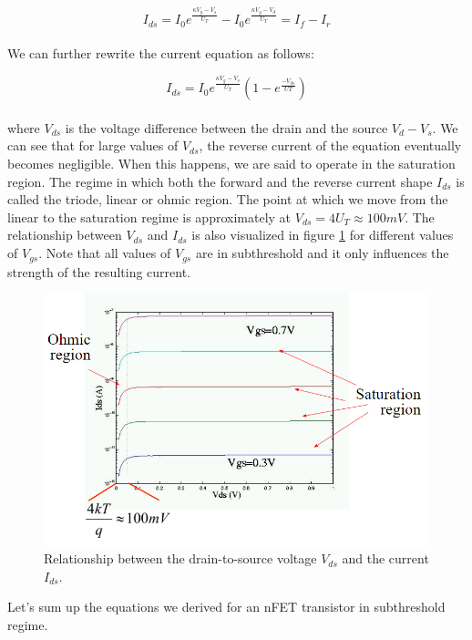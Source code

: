 \begin{equation}
    I_{ds} = I_0 e^{\frac{\kappa V_g - V_s}{U_T}} - I_0 e^{\frac{\kappa V_g - V_d}{U_T}} = I_f - I_r
\end{equation}\\

We can further rewrite the current equation as follows:

\begin{equation}
    I_{ds} = I_0 e^{\frac{\kappa V_g - V_s}{U_T}} (1 - e^{\frac{-V_{ds}}{UT}})
\end{equation}\\

where $V_{ds}$ is the voltage difference between the drain and the source $V_d - V_s$. We can see that for large values of $V_{ds}$, the reverse current of the equation eventually becomes negligible. When this happens, we are said to operate in the saturation region. The regime in which both the forward and the reverse current shape $I_{ds}$ is called the triode, linear or ohmic region. The point at which we move from the linear to the saturation regime is approximately at $V_{ds} = 4 U_T \approx 100 mV$. %
The relationship between $V_{ds}$ and $I_{ds}$ is also visualized in figure \ref{fig:vsd_vs_ids} for different values of $V_{gs}$. Note that all values of $V_{gs}$ are in subthreshold and it only influences the strength of the resulting current.\\

\begin{figure}
    \centering
    \includegraphics[width=.8\linewidth]{Figures/Vds_vs_Ids.PNG}
    \caption{Relationship between the drain-to-source voltage $V_{ds}$ and the current $I_{ds}$.}
    \label{fig:vsd_vs_ids}
\end{figure}

Let's sum up the equations we derived for an nFET transistor in subthreshold regime.\\

